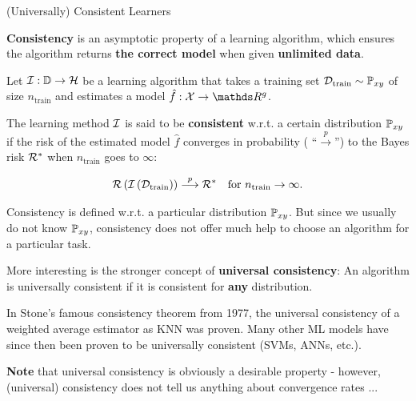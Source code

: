 \documentclass[11pt,compress,t,notes=noshow, xcolor=table]{beamer}
\begin{document}
\begin{vbframe}{(Universally) Consistent Learners}

\textbf{Consistency} is an asymptotic property of a learning algorithm, which ensures the algorithm returns \textbf{the correct model} when given \textbf{unlimited data}.

\lz 

Let $\mathcal{I}:\mathbb{D} \to \mathcal{H}$ be a learning algorithm that takes a training set $\mathcal{D}_{\text{train}} \sim \mathbb{P}_{xy}$ of size $n_\text{train}$ and estimates a model $\hat f: \Xspace \to \R^g$. 

\lz 

The learning method $\mathcal{I}$ is said to be \textbf{consistent} w.r.t. a certain distribution $\mathbb{P}_{xy}$ if the risk of the estimated model $\hat f$ converges in probability ( \enquote{$\overset{p}{\longrightarrow}$}) to the Bayes risk $\mathcal{R}^\ast$ when $n_\text{train}$ goes to $\infty$: 

$$
	\mathcal{R}\left(\mathcal{I}\left(\mathcal{D}_{\text{train}}\right)\right) \overset{p}{\longrightarrow} \mathcal{R}^\ast \quad \text{for } n_\text{train} \to \infty.
$$

\vfill




\framebreak 

Consistency is defined w.r.t. a particular distribution $\mathbb{P}_{xy}$.
But since we usually do not know $\mathbb{P}_{xy}$, consistency
does not offer much help to choose an algorithm for a particular task. 

\lz 

More interesting is the stronger concept of \textbf{universal consistency}: An algorithm is universally consistent if it is consistent for \textbf{any} distribution. 

\lz 

In Stone's famous consistency theorem from 1977, the universal consistency of a weighted average estimator as KNN was proven. Many other ML models have since then been proven to be universally consistent (SVMs, ANNs, etc.).

\lz

\textbf{Note} that universal consistency is obviously a desirable property - however, (universal) consistency does not tell us anything about convergence rates ...

\end{vbframe}



\end{document}
